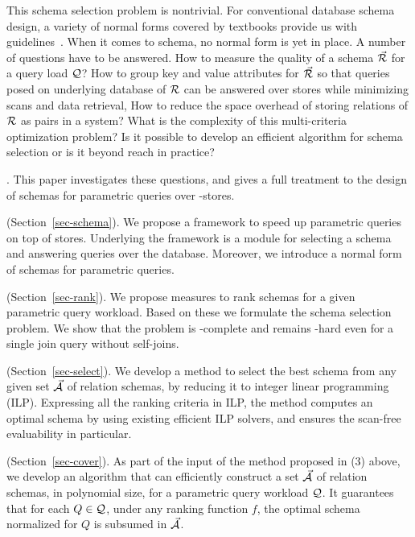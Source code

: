\vspace{0.36ex}
This schema selection problem is nontrivial.
For conventional database schema design, a variety of
normal forms covered by textbooks provide us with
guidelines~\cite{AbHuVi1995}.
When it comes to \baav schema, no normal form is
yet in place. A number of questions have to be answered.
How to measure
the quality of a \baav schema $\vec{{\mathcal R}}$ for a query load $\mathcal Q$?
How to group key and value attributes for $\vec{{\mathcal R}}$
so that queries posed on underlying database of ${\mathcal R}$
can be answered over \kv stores while minimizing scans and
data retrieval, 
How to reduce the space overhead of
storing relations of ${\mathcal R}$ as \baav pairs 
in a \kv system?
What is the complexity of this multi-criteria
optimization problem? Is it possible
to develop an efficient algorithm for schema
selection or is it beyond reach in practice?


. This paper investigates %
these questions, and gives a full treatment to the design of
\baav schemas for parametric \SQL queries over \kv-stores.

 (Section~\ref{sec-schema}). We propose a
framework to speed up parametric \SQL queries on top of \baav stores.
Underlying the framework is a module for selecting a \baav schema
and answering queries over the \baav database. %
Moreover, we introduce
a normal form of \baav schemas for parametric \SQL queries.

 (Section~\ref{sec-rank}).
We propose measures to rank \baav schemas for a
given parametric query workload. Based on these
we formulate the \baav schema selection problem.
We show that the problem is \NP-complete and remains \NP-hard
even for a single join query without self-joins.

 (Section~\ref{sec-select}).
We develop a method to select the best \baav  schema 
from any given set $\vec{{\mathcal A}}$ of \baav relation schemas, by reducing it to 
integer linear programming (ILP). Expressing all the ranking
criteria in ILP, the method computes an optimal \baav
schema by using existing efficient ILP solvers, and
ensures the scan-free evaluability in particular.

 (Section~\ref{sec-cover}).
As part of the input of the method proposed in (3) above,
we %
develop an algorithm that can efficiently construct a
set $\vec{{\mathcal A}}$ of \baav relation schemas, in polynomial
size, for a parametric query workload $\mathcal Q$.
It guarantees that for each $Q\in \mathcal Q$, under
any ranking function $f$, the optimal \baav schema
normalized for $Q$ is subsumed in $\vec{{\mathcal A}}$.

